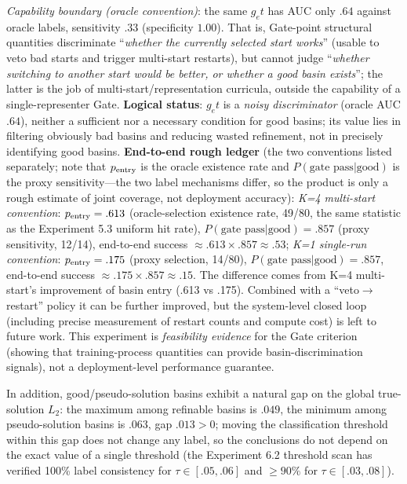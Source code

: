 \documentclass[11pt]{article}
\numberwithin{equation}{section}
\begin{document}
\emph{Capability boundary (oracle convention)}: the same $g_et$ has AUC only $.64$ against oracle labels, sensitivity $.33$ (specificity $1.00$). That is, Gate-point structural quantities discriminate ``\emph{whether the currently selected start works}'' (usable to veto bad starts and trigger multi-start restarts), but cannot judge ``\emph{whether switching to another start would be better, or whether a good basin exists}''; the latter is the job of multi-start/representation curricula, outside the capability of a single-representer Gate. \textbf{Logical status}: $g_et$ is a \emph{noisy discriminator} (oracle AUC $.64$), neither a sufficient nor a necessary condition for good basins; its value lies in filtering obviously bad basins and reducing wasted refinement, not in precisely identifying good basins. \textbf{End-to-end rough ledger} (the two conventions listed separately; note that $p_{\rm entry}$ is the oracle existence rate and $P(\text{gate pass}|\text{good})$ is the proxy sensitivity---the two label mechanisms differ, so the product is only a rough estimate of joint coverage, not deployment accuracy): \emph{K=4 multi-start convention}: $p_{\rm entry}=.613$ (oracle-selection existence rate, 49/80, the same statistic as the Experiment 5.3 uniform hit rate), $P(\text{gate pass}|\text{good})=.857$ (proxy sensitivity, 12/14), end-to-end success $\approx.613\times.857\approx.53$; \emph{K=1 single-run convention}: $p_{\rm entry}=.175$ (proxy selection, 14/80), $P(\text{gate pass}|\text{good})=.857$, end-to-end success $\approx.175\times.857\approx.15$. The difference comes from K=4 multi-start's improvement of basin entry (.613 vs .175). Combined with a ``veto$\to$restart'' policy it can be further improved, but the system-level closed loop (including precise measurement of restart counts and compute cost) is left to future work. This experiment is \emph{feasibility evidence} for the Gate criterion (showing that training-process quantities can provide basin-discrimination signals), not a deployment-level performance guarantee.

In addition, good/pseudo-solution basins exhibit a natural gap on the global true-solution $L_2$: the maximum among refinable basins is $.049$, the minimum among pseudo-solution basins is $.063$, gap $.013>0$; moving the classification threshold within this gap does not change any label, so the conclusions do not depend on the exact value of a single threshold (the Experiment 6.2 threshold scan has verified 100\% label consistency for $\tau\in[.05,.06]$ and $\ge90\%$ for $\tau\in[.03,.08]$).
\end{document}
